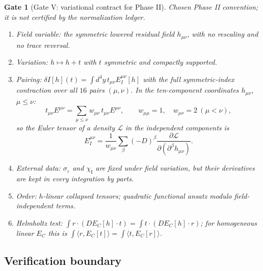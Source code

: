 \documentclass{article}
\newtheorem{gate}[proposition]{Gate}
\theoremstyle{remark}
\newcommand{\sigeps}{\sigma_\varepsilon}
\newcommand{\chiI}{\chi_{\mathrm I}}
\begin{document}
\begin{gate}[Gate V: variational contract for Phase II]
\label{gate:V}
\emph{Chosen Phase II convention; it is not certified by the normalization ledger.}
\begin{enumerate}
\item Field variable: the symmetric lowered residual field $h_{\mu\nu}$, with no rescaling and no trace reversal.
\item Variation: $h\mapsto h+t$ with $t$ symmetric and compactly supported.
\item Pairing: $\delta I[h](t)=\int d^4y\,t_{\mu\nu}E_I^{\mu\nu}[h]$ with the full symmetric-index contraction over all $16$ pairs $(\mu,\nu)$.
In the ten-component coordinates $h_{\mu\nu}$, $\mu\le\nu$:
\[
t_{\mu\nu}E^{\mu\nu}=\sum_{\mu\le\nu}w_{\mu\nu}\,t_{\mu\nu}E^{\mu\nu},\qquad w_{\mu\mu}=1,\quad w_{\mu\nu}=2\ (\mu<\nu),
\]
so the Euler tensor of a density $\mathcal L$ in the independent components is
\[
E_I^{\mu\nu}=\frac1{w_{\mu\nu}}\sum_\beta(-D)^\beta\frac{\partial\mathcal L}{\partial(\partial^\beta h_{\mu\nu})}.
\]
\item External data: $\sigeps$ and $\chiI$ are fixed under field variation, but their derivatives are kept in every integration by parts.
\item Order: $h$-linear collapsed tensors; quadratic functional ansatz modulo field-independent terms.
\item Helmholtz test: $\int r\cdot(DE_C[h]\cdot t)=\int t\cdot(DE_C[h]\cdot r)$; for homogeneous linear $E_C$ this is $\int\langle r,E_C[t]\rangle=\int\langle t,E_C[r]\rangle$.
\end{enumerate}
\end{gate}

\subsection{Verification boundary}
\label{sec:vb}
\end{document}
